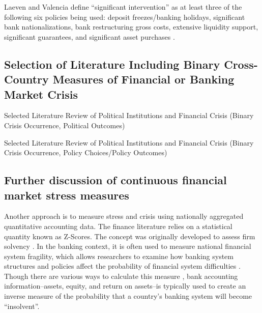 \documentclass[]{article}
\begin{document}
Laeven and Valencia define ``significant intervention'' as at least three of the following six policies being used: deposit freezes/banking holidays, significant bank nationalizations, bank restructuring gross costs, extensive liquidity support, significant guarantees, and significant asset purchases \citeyearpar[][229]{laeven2013}.

\subsection*{Selection of Literature Including Binary Cross-Country Measures of Financial or Banking Market Crisis}

\begin{table}[H]
\caption{Selected Literature Review of Political Institutions and Financial
Crisis (Binary Crisis Occurrence, Political Outcomes)}


\label{LitRevTable2}
\begin{center}

\vspace{0.5cm}
{\tiny{

}}
\end{center}
\end{table}

\begin{table}[H]
\caption{Selected Literature Review of Political Institutions and Financial
Crisis (Binary Crisis Occurrence, Policy Choices/Policy Outcomes)}


\label{LitRevTable}
\begin{center}

\vspace{0.5cm}
{\tiny{

}}
\end{center}
\end{table}

\subsection*{Further discussion of continuous financial market stress measures}

Another approach is to measure stress and crisis using nationally aggregated quantitative accounting data. The finance literature relies on a statistical quantity known as Z-Scores. The concept was originally developed to assess firm solvency \citep[see][]{roy1952}. In the banking context, it is often used to measure national financial system fragility, which allows researchers to examine how banking system structures and policies affect the probability of financial system difficulties \citep[e.g.][]{beck2013bank,vcihak2010islamic,laeven2009bank,uhde2009}. Though there are various ways to calculate this measure \citep[73]{Lepetit2013}, bank accounting information--assets, equity, and return on assets--is typically used to create an inverse measure of the probability that a country's banking system will become ``insolvent''.
\end{document}
